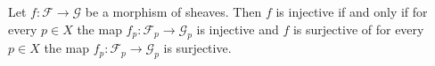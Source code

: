 Let $f\colon \mathcal{F}\to \mathcal{G}$ be a morphism of sheaves. Then
$f$ is injective if and only if for every $p \in X$ the map $f_p\colon \mathcal{F}_p \to \mathcal{G}_p$ is injective
and $f$ is surjective of for every $p \in X$ the map $f_p\colon \mathcal{F}_p\to \mathcal{G}_p$ is surjective.
